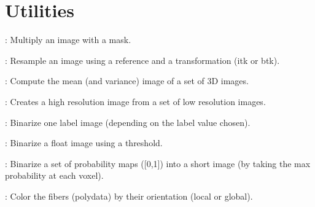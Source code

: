 \newpage
\section{Utilities}
\label{sec:utilities}

\begin{description}

\item[btkApplyMaskToImage]: Multiply an image with a mask.
\item[btkApplyTransformationToImage]: Resample an image using a reference and a transformation (itk or btk).
\item[btkAverage3DImages]: Compute the mean (and variance) image of a set of 3D images.
\item[btkAverageImagesWithReference]: Creates a high resolution image from a set of low resolution images.
\item[btkBinarizeLabels]: Binarize one label image (depending on the label value chosen).
\item[btkBinarizeMask]: Binarize a float image using a threshold.
\item[btkBinarizeTissueProbabilityMaps]: Binarize a set of probability maps ([0,1]) into a short image (by taking the max probability at each voxel).
\item[btkColorFiberTractsByOrientation]: Color the fibers (polydata) by their orientation (local or global).

\end{description}

